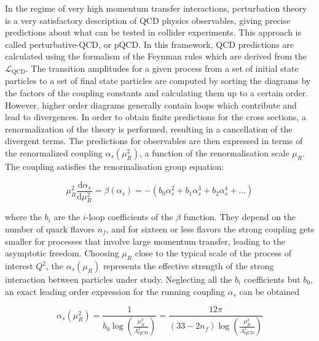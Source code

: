 In the regime of very high momentum transfer interactions, perturbation theory is a very satisfactory description of QCD physics observables, giving precise predictions about what can be tested in collider experiments. This approach is called perturbative-QCD, or pQCD. In this framework, QCD predictions are calculated using the formalism of the Feynman rules which are derived from the $\mathcal{L}_\mathrm{QCD}$.
The transition amplitudes for a given process from a set of initial state particles to a set of final state particles are computed by sorting the diagrams by the factors of the coupling constants and calculating them up to a certain order. However, higher order diagrams generally contain loops which contribute and lead to divergences.
In order to obtain finite predictions for the cross sections, a renormalization of the theory is performed, resulting in a cancellation of the divergent terms.
The predictions for observables are then expressed in terms of the renormalized coupling $\alpha_s(\mu^2_R)$, a function of the renormalisation scale $\mu_R$. 
The coupling satisfies the renormalisation group equation:

\begin{equation}\label{eqn:SM_e48}
\mu^2_R\frac{\mathrm{d}\alpha_s}{\mathrm{d}\mu^2_R} = \beta(\alpha_s) = - (b_0\alpha^2_s + b_1\alpha^3_s + b_2\alpha^4_s + \dotsc)
\end{equation}

\noindent where the $b_i$ are the $i$-loop coefficients of the $\beta$ function.
They depend on the number of quark flavors $n_f$, and for sixteen or less flavors the strong coupling gets smaller for processes that involve large momentum transfer, leading to the asymptotic freedom.
Choosing $\mu_R$ close to the typical scale of the process of interest $Q^2$, the $\alpha_s(\mu_R)$ represents the effective strength of the strong interaction between particles under study.
Neglecting all the $b_i$ coefficients but $b_0$, an exact leading order expression for the running coupling $\alpha_s$ can be obtained

\begin{equation}\label{eqn:SM_e49}
\alpha_s(\mu^2_R) = \frac{1}{b_0\log \left( \frac{\mu^2_R}{\Lambda^2_\mathrm{QCD}} \right) } = \frac{12\pi}{(33-2n_f)\log \left( \frac{\mu^2_R}{\Lambda^2_\mathrm{QCD}} \right) }
\end{equation}

